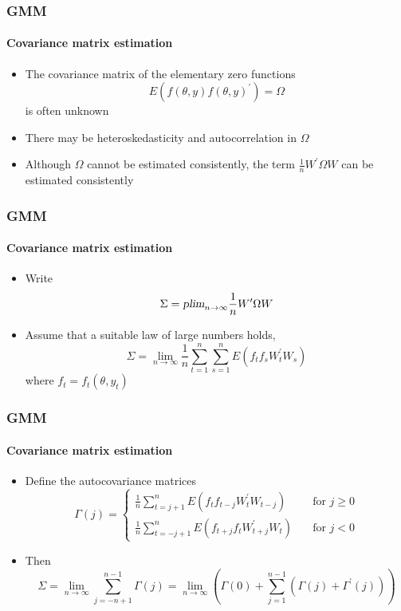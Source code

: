 \documentclass{beamer}
\begin{document}
\begin{frame}\frametitle{GMM}\framesubtitle{Covariance matrix estimation}
\begin{itemize}
    \item The covariance matrix of the elementary zero functions
    \begin{equation*}
    E\left( f\left( \theta ,y\right) f\left( \theta ,y\right) ^{\prime }\right) =\Omega
    \end{equation*}
    is often unknown
    \item There may be heteroskedasticity and autocorrelation in $\Omega $
    \item Although $\Omega $ cannot be estimated consistently, the term $\frac{1}{n}W^{\prime }\Omega W$ can be estimated consistently
\end{itemize}
\end{frame}


\begin{frame}\frametitle{GMM}\framesubtitle{Covariance matrix estimation}
\begin{itemize}
    \item Write
    \begin{equation*}
    \Sigma =\textsl{plim}_{n\rightarrow \infty }\frac{1}{n}W^{\prime }\Omega W
    \end{equation*}
    \item Assume that a suitable law of large numbers holds,
    \begin{equation*}
    \Sigma =\lim_{n\rightarrow \infty }\frac{1}{n}\sum_{t=1}^{n}\sum_{s=1}^{n}E\left( f_{t}f_{s}W_{t}^{\prime }W_{s}\right)
    \end{equation*}
    where $f_{t}=f_{t}\left( \theta ,y_{t}\right) $
\end{itemize}
\end{frame}


\begin{frame}\frametitle{GMM}\framesubtitle{Covariance matrix estimation}
\begin{itemize}
    \item Define the autocovariance matrices
    \begin{equation*}
    \Gamma (j)=\left\{
    \begin{array}{ll}
    \frac{1}{n}\sum_{t=j+1}^{n}E\left( f_{t}f_{t-j}W_{t}^{\prime }W_{t-j}\right)
    & \quad \text{for }j\geq 0 \\
    \frac{1}{n}\sum_{t=-j+1}^{n}E\left( f_{t+j}f_{t}W_{t+j}^{\prime
    }W_{t}\right)  & \quad \text{for }j<0
    \end{array}
    \right.
    \end{equation*}
    \item Then
    \begin{equation*}
    \Sigma =\lim_{n\rightarrow \infty }\sum_{j=-n+1}^{n-1}\Gamma(j)=\lim_{n\rightarrow \infty }\left( \Gamma (0)+\sum_{j=1}^{n-1}\left(\Gamma (j)+\Gamma ^{\prime }(j)\right) \right)
    \end{equation*}
\end{itemize}
\end{frame}
\end{document}
